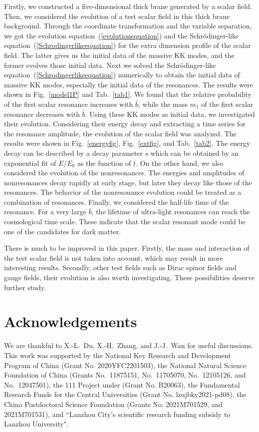 Firstly, we constructed a five-dimensional thick brane generated by a scalar field. Then, we considered the evolution of a test scalar field in this thick brane background. Through the coordinate transformation and the variable separation, we got the evolution equation~(\ref{evolutionequation}) and the Schr\"odinger-like equation~(\ref{Schrodingerlikeequation}) for the extra dimension profile of the scalar field. The latter gives us the initial data of the massive KK modes, and the former evolves those initial data. Next we solved the Schr\"odinger-like equation~(\ref{Schrodingerlikeequation}) numerically to obtain the initial data of massive KK modes, especially the initial data of the resonances. The results were shown in Fig.~\ref{model1P} and Tab.~\ref{tab1}. We found that the relative probability of the first scalar resonance increases with $\bar{b}$, while the mass $m_{1}$ of the first scalar resonance decreases with $\bar{b}$. Using these KK modes as initial data, we investigated their evolution. Considering their energy decay and  extracting a time series for the resonance amplitude, the evolution of the scalar field was analyzed. The results were shown in Fig.~\ref{energyfig}, Fig.~\ref{extfig}, and Tab.~\ref{tab2}. The energy decay can be described by a decay parameter $s$ which can be obtained by an exponential fit of $E/E_{0}$ as the function of $\bar{t}$. On the other hand, we also considered the evolution of the nonresonances. The energies and amplitudes of nonresonances decay rapidly at early stage, but later they decay like those of the resonances. The behavior of the nonresonance evolution could be treated as a combination of resonances. Finally, we considered the half-life time of the resonance. For a very large $\bar{b}$, the lifetime of ultra-light resonances can reach the cosmological time scale. These indicate that the scalar resonant mode could be one of the candidates for dark matter.

There is much to be improved in this paper. Firstly, the mass and interaction of the test scalar field is not taken into account, which may result in more interesting results. Secondly, other test fields such as Dirac spinor fields and gauge fields, their evolution is also worth investigating. These possibilities deserve further study.



\section*{Acknowledgements}
We are thankful to X.-L.~Du, X.-H.~Zhang, and J.-J.~Wan for useful discussions. This work was supported by the National Key Research and Development Program of China (Grant No. 2020YFC2201503), the National Natural Science Foundation of China (Grants No.~11875151, No.~11705070, No.~12105126, and No.~12047501), the 111 Project under (Grant No. B20063), the Fundamental Research Funds for the Central Universities (Grant No. lzujbky2021-pd08), the China Postdoctoral Science Foundation (Grants No. 2021M701529, and 2021M701531), and ``Lanzhou City's scientific research funding subsidy to Lanzhou University".




